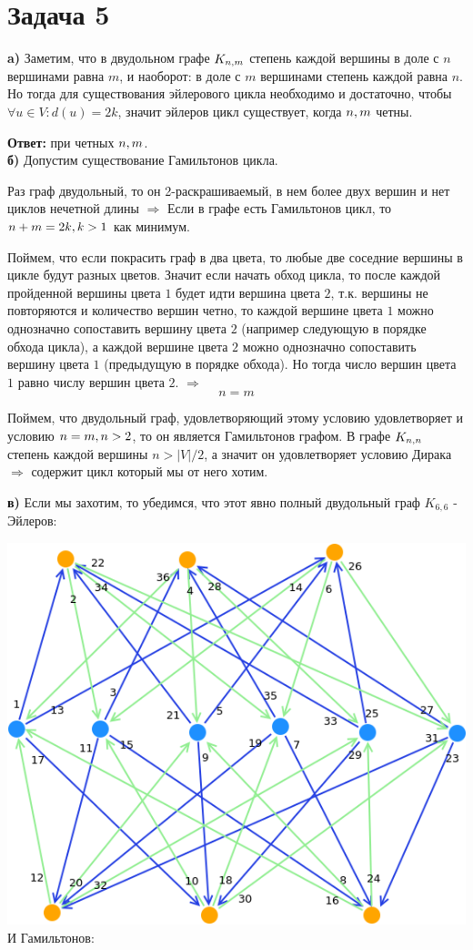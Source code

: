 \documentclass{article}
\begin{document}
\section{Задача 5}
\textbf{a)} Заметим, что в двудольном графе $K_{n,\space m}$ степень каждой вершины в доле с $n$ вершинами равна $m$, и наоборот: в доле с $m$ вершинами степень каждой равна $n$.
Но тогда для существования эйлерового цикла необходимо и достаточно, чтобы $\forall u \in V: d(u) = 2k$, значит эйлеров цикл существует, когда $n, \space m$ четны.

\textbf{Ответ:} при четных $n,\space m$.
\\
\textbf{б)} Допустим существование Гамильтонов цикла.

Раз граф двудольный, то он 2-раскрашиваемый, в нем более двух вершин и нет циклов нечетной длины $\Rightarrow$ Если в графе есть Гамильтонов цикл, то $n + m = 2k, \space k > 1$ как минимум. 
 
 Поймем, что если покрасить граф в два цвета, то любые две соседние вершины в цикле будут разных цветов. Значит если начать обход цикла, то после каждой пройденной вершины цвета $1$ будет идти вершина цвета $2$, т.к. вершины не повторяются и количество вершин четно, то каждой вершине цвета $1$ можно однозначно сопоставить вершину цвета $2$ (например следующую в порядке обхода цикла), а каждой вершине цвета $2$ можно однозначно сопоставить вершину цвета $1$ (предыдущую в порядке обхода). Но тогда число вершин цвета $1$ равно числу вершин цвета $2$. $\Rightarrow$ $$n = m$$
 
 Поймем, что двудольный граф, удовлетворяющий этому условию удовлетворяет и условию $n = m,\space n > 2$, то он является Гамильтонов графом. 
 В графе $K_{n,\space n}$ степень каждой вершины $n > |V| / 2$, а значит он удовлетворяет условию Дирака $\Rightarrow$ содержит цикл который мы от него хотим.

\textbf{в)} Если мы захотим, то убедимся, что этот явно полный двудольный граф $K_{6,6}$ - Эйлеров:

\includegraphics[scale=0.7]{5_1}
\newpage
И Гамильтонов:
\end{document}
